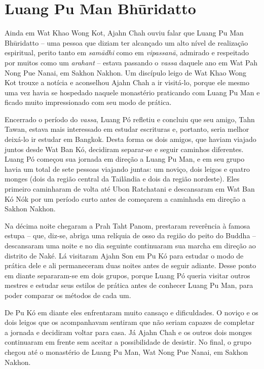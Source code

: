 \chapter{Luang Pu Man Bhūridatto}

Ainda em Wat Khao Wong Kot, Ajahn Chah ouviu falar que Luang Pu Man
Bhūridatto -- uma pessoa que diziam ter alcançado um alto nível de
realização espiritual, perito tanto em \emph{samādhi} como em
\emph{vipassanā}, admirado e respeitado por muitos como um
\emph{arahant} -- estava passando o \emph{vassa} daquele ano em Wat Pah
Nong Pue Nanai, em Sakhon Nakhon. Um discípulo leigo de Wat Khao Wong
Kot trouxe a notícia e aconselhou Ajahn Chah a ir visitá-lo, porque ele
mesmo uma vez havia se hospedado naquele monastério praticando com Luang
Pu Man e ficado muito impressionado com seu modo de prática.

Encerrado o período do \emph{vassa}, Luang Pó refletiu e concluiu que
seu amigo, Tahn Tawan, estava mais interessado em estudar escrituras e,
portanto, seria melhor deixá-lo ir estudar em Bangkok. Desta forma os
dois amigos, que haviam viajado juntos desde Wat Ban Kó, decidiram
separar-se e seguir caminhos diferentes. Luang Pó começou sua jornada em
direção a Luang Pu Man, e em seu grupo havia um total de sete pessoas
viajando juntas: um noviço, dois leigos e quatro monges (dois da região
central da Tailândia e dois da região nordeste). Eles primeiro
caminharam de volta até Ubon Ratchatani e descansaram em Wat Ban Kó Nók
por um período curto antes de começarem a caminhada em direção a Sakhon
Nakhon.

Na décima noite chegaram a Prah Taht Panom, prestaram reverência à
famosa estupa -- que, diz-se, abriga uma relíquia de osso da região do
peito do Buddha -- descansaram uma noite e no dia seguinte continuaram
sua marcha em direção ao distrito de Naké. Lá visitaram Ajahn Son em Pu
Kó para estudar o modo de prática dele e ali permaneceram duas noites
antes de seguir adiante. Desse ponto em diante separaram-se em dois
grupos, porque Luang Pó queria visitar outros mestres e estudar seus
estilos de prática antes de conhecer Luang Pu Man, para poder comparar
os métodos de cada um.

De Pu Kó em diante eles enfrentaram muito cansaço e dificuldades. O
noviço e os dois leigos que os acompanhavam sentiram que não seriam
capazes de completar a jornada e decidiram voltar para casa. Já Ajahn
Chah e os outros dois monges continuaram em frente sem aceitar a
possibilidade de desistir. No final, o grupo chegou até o monastério de
Luang Pu Man, Wat Nong Pue Nanai, em Sakhon Nakhon.

